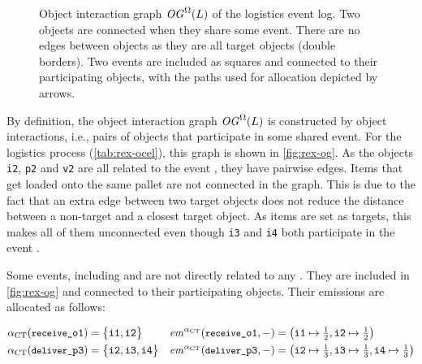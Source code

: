 \begin{figure}[t]
\begin{small}
\begin{center}
    \end{center}
    \caption{Object interaction graph $\mathit{OG}^\Omega(L)$ of the logistics event log. Two objects are connected when they share some event. There are no edges between  objects as they are all target objects (double borders). Two events are included as squares and connected to their participating objects, with the paths used for allocation depicted by arrows.}
    \label{fig:rex-og}
  \end{small}
\end{figure}

By definition, the object interaction graph $\mathit{OG}^\Omega(L)$ is constructed by object interactions, i.e., pairs of objects that participate in some shared event. For the logistics process (\autoref{tab:rex-ocel}), this graph is shown in \autoref{fig:rex-og}.
As the objects \texttt{i2}, \texttt{p2} and \texttt{v2} are all related to the event , they have pairwise edges.
%
Items that get loaded onto the same pallet are not connected in the graph. This is due to the fact that an extra edge between two target objects does not reduce the distance between a non-target and a closest target object. As items are set as targets, this makes all of them unconnected even though \texttt{i3} and \texttt{i4} both participate in the event .

Some events, including  and  are not directly related to any . They are included in \autoref{fig:rex-og} and connected to their participating objects. Their emissions are allocated as follows:

\begin{align*}
  \alphaCTall(\ev{receive}{o1}) &= \bigl\{ \itm{1},\itm{2} \bigr\} &
  \emAlloc{\alphaCTall}&(\ev{receive}{o1},-) = \bigl(
    \itm{1}\mapsto\tfrac{1}{2},
    \itm{2}\mapsto\tfrac{1}{2}
  \bigr)
  \\ %
  \alphaCTall(\ev{deliver}{p3}) &= \bigl\{ \itm{2},\itm{3},\itm{4} \bigr\} &
  \emAlloc{\alphaCTall}&(\ev{deliver}{p3},-) = \bigl(
    \itm{2}\mapsto\tfrac{1}{3},
    \itm{3}\mapsto\tfrac{1}{3},
    \itm{4}\mapsto\tfrac{1}{3}
  \bigr)
\end{align*}

